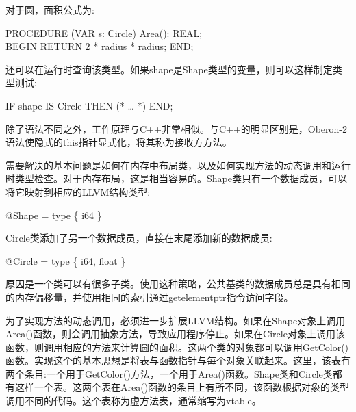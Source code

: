 对于圆，面积公式为:\par

\begin{tcolorbox}[colback=white,colframe=black]
PROCEDURE (VAR s: Circle) Area(): REAL; \\
BEGIN RETURN 2 * radius * radius; END;
\end{tcolorbox}

还可以在运行时查询该类型。如果shape是Shape类型的变量，则可以这样制定类型测试:\par

\begin{tcolorbox}[colback=white,colframe=black]
IF shape IS Circle THEN (* … *) END;
\end{tcolorbox}

除了语法不同之外，工作原理与C++非常相似。与C++的明显区别是，Oberon-2语法使隐式的this指针显式化，将其称为接收方方法。\par

需要解决的基本问题是如何在内存中布局类，以及如何实现方法的动态调用和运行时类型检查。对于内存布局，这是相当容易的。Shape类只有一个数据成员，可以将它映射到相应的LLVM结构类型:\par

\begin{tcolorbox}[colback=white,colframe=black]
@Shape = type \{ i64 \}
\end{tcolorbox}

Circle类添加了另一个数据成员，直接在末尾添加新的数据成员:\par

\begin{tcolorbox}[colback=white,colframe=black]
@Circle = type \{ i64, float \}
\end{tcolorbox}

原因是一个类可以有很多子类。使用这种策略，公共基类的数据成员总是具有相同的内存偏移量，并使用相同的索引通过getelementptr指令访问字段。\par

为了实现方法的动态调用，必须进一步扩展LLVM结构。如果在Shape对象上调用Area()函数，则会调用抽象方法，导致应用程序停止。如果在Circle对象上调用该函数，则调用相应的方法来计算圆的面积。这两个类的对象都可以调用GetColor()函数。实现这个的基本思想是将表与函数指针与每个对象关联起来。这里，该表有两个条目:一个用于GetColor()方法，一个用于Area()函数。Shape类和Circle类都有这样一个表。这两个表在Area()函数的条目上有所不同，该函数根据对象的类型调用不同的代码。这个表称为虚方法表，通常缩写为vtable。\par

